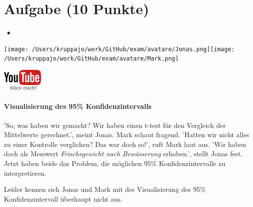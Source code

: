 \documentclass[a4paper, 9pt]{scrartcl}\usepackage[]{graphicx}\usepackage[]{xcolor}
\begin{document}
\section{Aufgabe \hfill (10 Punkte)}


 
\ifcollection
\begin{flushright}
\tiny
\textbf{\examinhaltstart}
\exammodulestatversuch $\;\bullet$
\exammodulebiostat
\vspace{-4Ex}
\end{flushright}
\begin{minipage}[t]{0.5\textwidth}
\texttt{[image: /Users/kruppajo/work/GitHub/exam/avatare/Jonas.png]}\hspace{-4mm}\texttt{[image: /Users/kruppajo/work/GitHub/exam/avatare/Mark.png]}
\end{minipage}
\begin{minipage}[t]{0.5\textwidth}
\hfill
\href{https://youtu.be/CN_O4fYPbhs}{\includegraphics[width = 2cm]{img/youtube}}
\end{minipage}
\fi



\ifcollection
\paragraph{Visualisierung des 95\% Konfidenzintervalls}
\fi

'So, was haben wir gemacht? Wir haben einen t-test für den Vergleich der Mittelwerte gerechnet.', meint Jonas. Mark schaut fragend. 'Hatten wir nicht alles zu einer Kontrolle verglichen? Das war doch so!', ruft Mark laut aus. 'Wir haben doch als Messwert \textit{Frischegewicht nach Bewässerung} erhoben.', stellt Jonas fest. Jetzt haben beide das Problem, die möglichen 95\% Konfidenzintervalle zu interpretieren.

\vspace{1ex}

Leider kennen sich Jonas und Mark mit der Visualisierung des 95\% Konfidenzintervall überhaupt nicht aus. 
\end{document}
